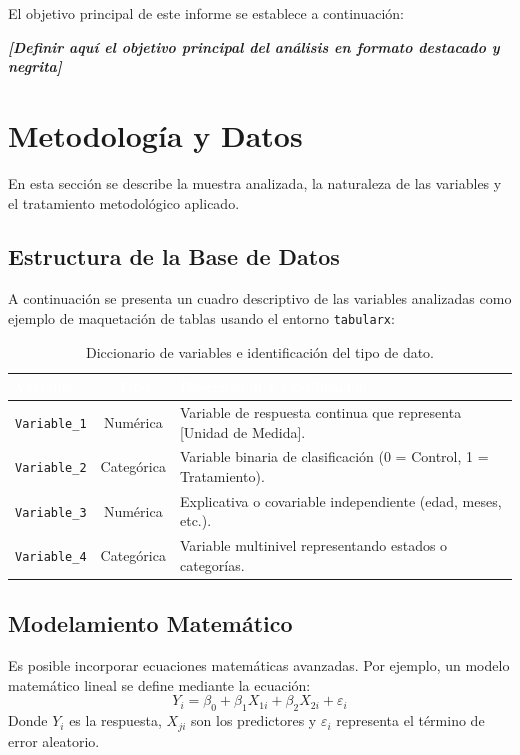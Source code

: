 \documentclass[10pt,a4paper]{article}
\begin{document}
El objetivo principal de este informe se establece a continuación:
\begin{center}
    \textit{\textbf{[Definir aquí el objetivo principal del análisis en formato destacado y negrita]}}
\end{center}

\section{Metodología y Datos}
En esta sección se describe la muestra analizada, la naturaleza de las variables y el tratamiento metodológico aplicado.

\subsection{Estructura de la Base de Datos}
A continuación se presenta un cuadro descriptivo de las variables analizadas como ejemplo de maquetación de tablas usando el entorno \texttt{tabularx}:

\begin{table}[H]
\centering
\small
\begin{tabularx}{\textwidth}{l c X}
\toprule[1.5pt]
\rowcolor{PrimaryBlue} \textcolor{white}{\textbf{Variable}} & \textcolor{white}{\textbf{Tipo}} & \textcolor{white}{\textbf{Descripción y Codificación}} \\
\midrule
\texttt{Variable\_1} & Numérica & Variable de respuesta continua que representa [Unidad de Medida]. \\
\rowcolor{LightBlue}
\texttt{Variable\_2} & Categórica & Variable binaria de clasificación (0 = Control, 1 = Tratamiento). \\
\texttt{Variable\_3} & Numérica & Explicativa o covariable independiente (edad, meses, etc.). \\
\rowcolor{LightBlue}
\texttt{Variable\_4} & Categórica & Variable multinivel representando estados o categorías. \\
\bottomrule[1.5pt]
\end{tabularx}
\caption{Diccionario de variables e identificación del tipo de dato.}
\label{tab:variables}
\end{table}

\subsection{Modelamiento Matemático}
Es posible incorporar ecuaciones matemáticas avanzadas. Por ejemplo, un modelo matemático lineal se define mediante la ecuación:
\begin{equation}
    Y_i = \beta_0 + \beta_1 X_{1i} + \beta_2 X_{2i} + \varepsilon_i
\end{equation}
Donde $Y_i$ es la respuesta, $X_{ji}$ son los predictores y $\varepsilon_i$ representa el término de error aleatorio.
\end{document}
